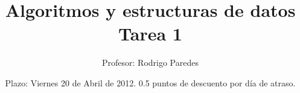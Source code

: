 \documentclass[11pt]{utalcaDoc}
\title{{\bf Algoritmos y estructuras de datos}\\Tarea 1}
\author{Profesor: Rodrigo Paredes}
\date{Plazo: Viernes 20 de Abril de 2012. 0.5 puntos de descuento por d\'ia de atraso.}
\begin{document}
\renewcommand{\figurename}{Figura~}
\renewcommand{\tablename}{Tabla~}

%
% 
% 
\end{document}
